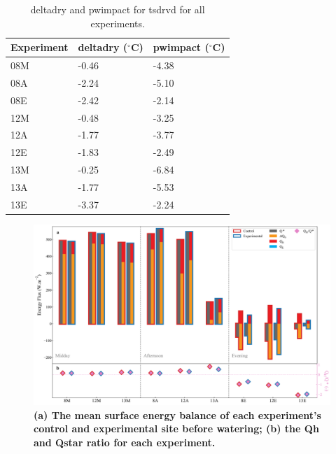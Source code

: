 \documentclass[final,3p,times,authoryear]{elsarticle}
\begin{document}
\begin{table}[!ht]\caption{\gls{deltadry} and \gls{pwimpact} for \gls{tsdrvd} for all experiments.}
    \centering
    \begin{tabular}{|l|l|l|}
    \hline
        Experiment & \gls{deltadry} ($^{\circ}$C) &\gls{pwimpact} ($^{\circ}$C) \\ \hline
        08M & -0.46&-4.38 \\ \hline
        08A & -2.24&-5.10 \\ \hline
        08E & -2.42&-2.14 \\ \hline
        12M & -0.48&-3.25 \\ \hline
        12A & -1.77&-3.77 \\ \hline
        12E & -1.83&-2.49 \\ \hline
        13M & -0.25&-6.84 \\ \hline
        13A & -1.77&-5.53 \\ \hline
        13E & -3.37&-2.24 \\ \hline
    \end{tabular}\label{table:7.5}
\end{table}





\begin{figure}
\centering
\includegraphics[trim={0 0 0 0},clip,scale=0.4]{seb_dry.png}
\caption{\bf (a) The mean surface energy balance of each experiment's control and experimental site before watering; (b) the \gls{Qh} and \gls{Qstar} ratio for each experiment.}
 \label{fig:7.18}
\end{figure}
\end{document}
